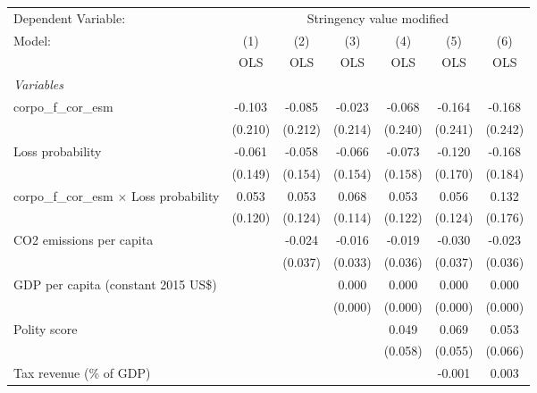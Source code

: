 
\begingroup
\centering
\begin{tabular}{lcccccc}
   \toprule
   Dependent Variable: & \multicolumn{6}{c}{Stringency value modified}\\
   Model:                                           & (1)     & (2)     & (3)     & (4)     & (5)     & (6)\\  
                                                    &  OLS    & OLS     & OLS     & OLS     & OLS     & OLS\\  
   \midrule
   \emph{Variables}\\
   corpo\_f\_cor\_esm                               & -0.103  & -0.085  & -0.023  & -0.068  & -0.164  & -0.168\\   
                                                    & (0.210) & (0.212) & (0.214) & (0.240) & (0.241) & (0.242)\\   
   Loss probability                                 & -0.061  & -0.058  & -0.066  & -0.073  & -0.120  & -0.168\\   
                                                    & (0.149) & (0.154) & (0.154) & (0.158) & (0.170) & (0.184)\\   
   corpo\_f\_cor\_esm $\times$ Loss probability     & 0.053   & 0.053   & 0.068   & 0.053   & 0.056   & 0.132\\   
                                                    & (0.120) & (0.124) & (0.114) & (0.122) & (0.124) & (0.176)\\   
   CO2 emissions per capita                         &         & -0.024  & -0.016  & -0.019  & -0.030  & -0.023\\   
                                                    &         & (0.037) & (0.033) & (0.036) & (0.037) & (0.036)\\   
   GDP per capita (constant 2015 US\$)              &         &         & 0.000   & 0.000   & 0.000   & 0.000\\   
                                                    &         &         & (0.000) & (0.000) & (0.000) & (0.000)\\   
   Polity score                                     &         &         &         & 0.049   & 0.069   & 0.053\\   
                                                    &         &         &         & (0.058) & (0.055) & (0.066)\\   
   Tax revenue (\% of GDP)                          &         &         &         &         & -0.001  & 0.003\\   

\end{tabular}
